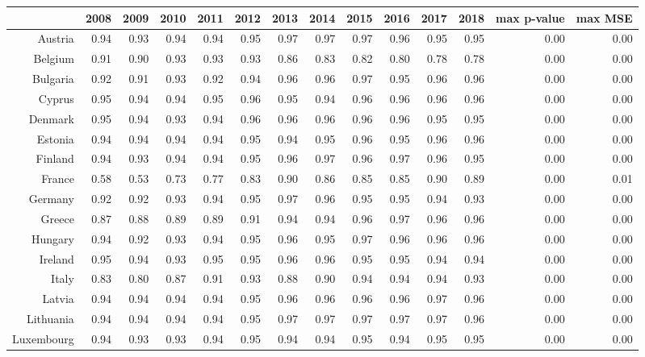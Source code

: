 \documentclass[a4paper,twoside,10pt]{article}
\begin{document}
\begin{table}[ht]
	\centering
			\tabcolsep=0.11cm
	\begin{tabular}{|r|rrrrr|rrrrrr|rr|}
		\hline
		& 2008 & 2009 & 2010 & 2011 & 2012 & 2013 & 2014 & 2015 & 2016 & 2017 & 2018 & max p-value & max MSE \\ 
		\hline
		Austria & 0.94 & 0.93 & 0.94 & 0.94 & 0.95 & 0.97 & 0.97 & 0.97 & 0.96 & 0.95 & 0.95 & 0.00 & 0.00 \\
		Belgium & 0.91 & 0.90 & 0.93 & 0.93 & 0.93 & 0.86 & 0.83 & 0.82 & 0.80 & 0.78 & 0.78 & 0.00 & 0.00 \\ 
		Bulgaria & 0.92 & 0.91 & 0.93 & 0.92 & 0.94 & 0.96 & 0.96 & 0.97 & 0.95 & 0.96 & 0.96 & 0.00 & 0.00 \\
		Cyprus & 0.95 & 0.94 & 0.94 & 0.95 & 0.96 & 0.95 & 0.94 & 0.96 & 0.96 & 0.96 & 0.96 & 0.00 & 0.00 \\ 
		Denmark & 0.95 & 0.94 & 0.93 & 0.94 & 0.96 & 0.96 & 0.96 & 0.96 & 0.96 & 0.95 & 0.95 & 0.00 & 0.00 \\		\hline
		Estonia & 0.94 & 0.94 & 0.94 & 0.94 & 0.95 & 0.94 & 0.95 & 0.96 & 0.95 & 0.96 & 0.96 & 0.00 & 0.00 \\
		Finland & 0.94 & 0.93 & 0.94 & 0.94 & 0.95 & 0.96 & 0.97 & 0.96 & 0.97 & 0.96 & 0.95 & 0.00 & 0.00 \\ 
		France & 0.58 & 0.53 & 0.73 & 0.77 & 0.83 & 0.90 & 0.86 & 0.85 & 0.85 & 0.90 & 0.89 & 0.00 & 0.01 \\
		Germany & 0.92 & 0.92 & 0.93 & 0.94 & 0.95 & 0.97 & 0.96 & 0.95 & 0.95 & 0.94 & 0.93 & 0.00 & 0.00 \\
		Greece & 0.87 & 0.88 & 0.89 & 0.89 & 0.91 & 0.94 & 0.94 & 0.96 & 0.97 & 0.96 & 0.96 & 0.00 & 0.00 \\ 		\hline
		Hungary & 0.94 & 0.92 & 0.93 & 0.94 & 0.95 & 0.96 & 0.95 & 0.97 & 0.96 & 0.96 & 0.96 & 0.00 & 0.00 \\
		Ireland & 0.95 & 0.94 & 0.93 & 0.95 & 0.95 & 0.96 & 0.96 & 0.95 & 0.95 & 0.94 & 0.94 & 0.00 & 0.00 \\
		Italy & 0.83 & 0.80 & 0.87 & 0.91 & 0.93 & 0.88 & 0.90 & 0.94 & 0.94 & 0.94 & 0.93 & 0.00 & 0.00 \\ 
		Latvia & 0.94 & 0.94 & 0.94 & 0.94 & 0.95 & 0.96 & 0.96 & 0.96 & 0.96 & 0.97 & 0.96 & 0.00 & 0.00 \\
		Lithuania & 0.94 & 0.94 & 0.94 & 0.94 & 0.95 & 0.97 & 0.97 & 0.97 & 0.97 & 0.97 & 0.96 & 0.00 & 0.00 \\
		Luxembourg & 0.94 & 0.93 & 0.93 & 0.94 & 0.95 & 0.94 & 0.94 & 0.95 & 0.94 & 0.95 & 0.95 & 0.00 & 0.00 \\		\hline

\end{tabular}
\end{table}
\end{document}
